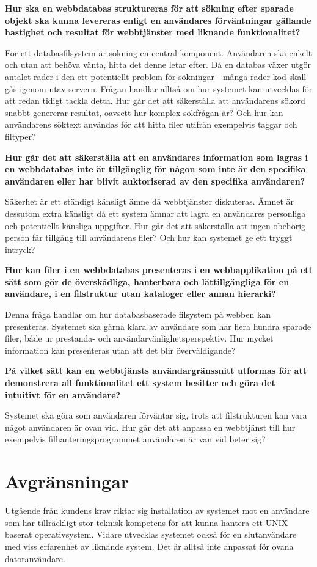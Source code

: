 \documentclass[a4paper,12pt,oneside,final]{extbook}
\begin{document}
\textbf{Hur ska en webbdatabas struktureras för att sökning efter sparade objekt ska kunna levereras enligt en användares förväntningar gällande hastighet och resultat för webbtjänster med liknande funktionalitet?}

För ett databasfilsystem är sökning en central komponent. Användaren ska enkelt och utan att behöva vänta, hitta det denne letar efter. Då en databas växer utgör antalet rader i den ett potentiellt problem för sökningar - många rader kod skall gås igenom utav servern. Frågan handlar alltså om hur systemet kan utvecklas för att redan tidigt tackla detta. Hur går det att säkerställa att användarens sökord snabbt genererar resultat, oavsett hur komplex sökfrågan är? Och hur kan användarens söktext användas för att hitta filer utifrån exempelvis taggar och filtyper?

\textbf{Hur går det att säkerställa att en användares information som lagras i en webbdatabas inte är tillgänglig för någon som inte är den specifika användaren eller har blivit  auktoriserad av den specifika användaren?}

Säkerhet är ett ständigt känsligt ämne då webbtjänster diskuteras. Ämnet är dessutom extra känsligt då ett system ämnar att lagra en användares personliga och potentiellt känsliga uppgifter. Hur går det att säkerställa att ingen obehörig person får tillgång till användarens filer? Och hur kan systemet ge ett tryggt intryck?

\textbf{Hur kan filer i en webbdatabas presenteras i en webbapplikation på ett sätt som gör de överskådliga, hanterbara och lättillgängliga för en användare, i en filstruktur utan kataloger eller annan hierarki?}

Denna fråga handlar om hur databasbaserade filsystem på webben kan presenteras. Systemet ska gärna klara av användare som har flera hundra sparade filer, både ur prestanda- och användarvänlighetsperspektiv. Hur mycket information kan presenteras utan att det blir överväldigande?

\textbf{På vilket sätt kan en webbtjänsts användargränssnitt utformas för att demonstrera all funktionalitet ett system besitter och göra det intuitivt för en användare?}

Systemet ska göra som användaren förväntar sig, trots att filstrukturen kan vara något användaren är ovan vid. Hur går det att anpassa en webbtjänst till hur exempelvis filhanteringsprogrammet användaren är van vid beter sig?

\section{Avgränsningar}
Utgående från kundens krav riktar sig installation av systemet mot en användare som har tillräckligt stor teknisk kompetens för att kunna hantera ett UNIX baserat operativsystem. Vidare utvecklas systemet också för en slutanvändare med viss erfarenhet av liknande system. Det är alltså inte anpassat för ovana datoranvändare.
\end{document}
